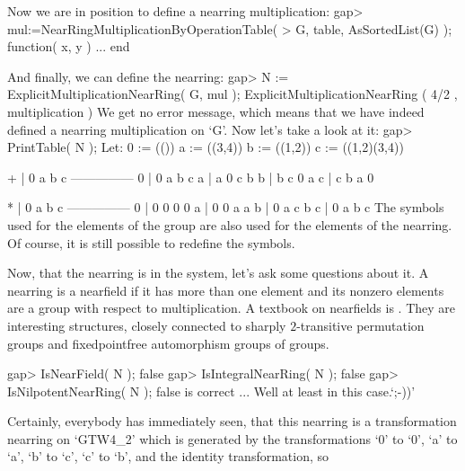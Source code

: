 Now we are in position to define a nearring multiplication:
\beginexample
    gap> mul:=NearRingMultiplicationByOperationTable(                        
    >             G, table, AsSortedList(G) );
    function( x, y ) ... end
\endexample

And finally, we can define the nearring:
\beginexample
    gap> N := ExplicitMultiplicationNearRing( G, mul );
    ExplicitMultiplicationNearRing ( 4/2 , multiplication )
\endexample
We get no error message, which means that we have 
indeed defined a nearring multiplication on `G'.
Now let's take a look at it:
\beginexample
    gap> PrintTable( N );
    Let:
    0 := (())
    a := ((3,4))
    b := ((1,2))
    c := ((1,2)(3,4))

      +  | 0  a  b  c  
      ---------------
      0  | 0  a  b  c  
      a  | a  0  c  b  
      b  | b  c  0  a  
      c  | c  b  a  0  

      *  | 0  a  b  c  
      ---------------
      0  | 0  0  0  0  
      a  | 0  0  a  a  
      b  | 0  a  c  b  
      c  | 0  a  b  c  
\endexample
The symbols used for the elements of the group are also used for the
elements of the nearring. Of course, it is still possible to redefine the 
symbols.



Now, that the nearring is in the system, let's ask
some questions about it. A nearring is a nearfield if
it has more than one element and its nonzero elements are
a group with respect to multiplication. A textbook
on nearfields is \cite{Waehling:Fastkoerper}. They are interesting
structures, closely connected to sharply $2$-transitive permutation
groups and fixedpointfree automorphism groups of groups.

\beginexample
    gap> IsNearField( N );
    false
    gap> IsIntegralNearRing( N );
    false
    gap> IsNilpotentNearRing( N );
    false
\endexample
\cite{Pilz:Nearrings} is correct ... Well at least in this case.`;-))'



Certainly, everybody has immediately seen, that this
nearring is a transformation nearring on `GTW4_2'
which is generated by the transformations
`0' to `0', `a' to `a', `b' to `c', `c' to `b', and
the identity transformation, so

